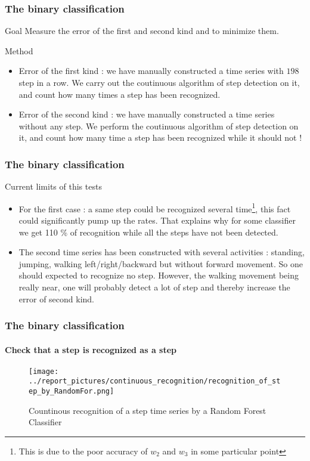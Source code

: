 \documentclass[11pt, sans]{beamer}
\begin{document}
\begin{frame}
\frametitle{The binary classification}

\begin{alertblock}{Goal}
Measure the error of the first and second kind and to minimize them.
\end{alertblock}

\begin{exampleblock}{Method}
\begin{itemize}
	\item Error of the first kind : we have manually constructed a time series with $198$ step in a row. We carry out the coutinuous algorithm of step detection on it, and count how many times a step has been recognized.
	\item Error of the second kind : we have manually constructed a time series without any step. We perform the coutinuous algorithm of step detection on it, and count how many time a step has been recognized while it should not !
\end{itemize}
\end{exampleblock}

\end{frame}

\begin{frame}
\frametitle{The binary classification}
\begin{alertblock}{Current limits of this tests}
\begin{itemize}
	\item For the first case : a same step could be recognized several time\footnote{This is due to the poor accuracy of $w_2$ and $w_3$ in some particular point}, this fact could significantly pump up the rates. That explains why for some classifier we get 110 \% of recognition while all the steps have not been detected.
	\item The second time series has been constructed with several activities : standing, jumping, walking left/right/backward but without forward movement. So one should expected to recognize no step. However, the walking movement being really near, one will probably detect a lot of step and thereby increase the error of second kind.
\end{itemize}
\end{alertblock}

\end{frame}
	
\begin{frame}
\frametitle{The binary classification}
\framesubtitle{Check that a step is recognized as a step}

\begin{figure}[H]
	\texttt{[image: ../report\_pictures/continuous\_recognition/recognition\_of\_step\_by\_RandomFor.png]}
	\caption{Countinous recognition of a step time series by a Random Forest Classifier}
	\label{a_step_is_a_step}
\end{figure}

\end{frame}
\end{document}
